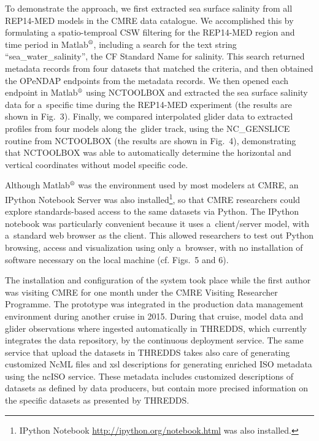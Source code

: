 \documentclass[osd, online, hvmath]{copernicus}
\begin{document}
To demonstrate the approach, we first extracted sea surface salinity from all REP14-MED models in the CMRE data catalogue. We accomplished this by 
formulating a spatio-temproal CSW filtering for the REP14-MED region and time period in Matlab$^{\text{\textregistered}}$, including a search for the text
string ``sea\_water\_salinity'', the CF Standard Name for salinity. This search returned metadata records from four datasets that matched the criteria, and then obtained the OPeNDAP endpoints from the metadata records. 
We then opened each endpoint in Matlab$^{\text{\textregistered}}$ using NCTOOLBOX and extracted the sea surface salinity data for a~specific time during the REP14-MED
experiment (the results are shown in Fig.~3). Finally, we compared interpolated glider data to extracted profiles from four models along the~glider track, using
the NC\_GENSLICE routine from NCTOOLBOX (the results are shown in Fig.~4), demonstrating that NCTOOLBOX was able to automatically
determine the horizontal and vertical coordinates without model specific code.

Although Matlab$^{\text{\textregistered}}$ was the environment used by
most modelers at CMRE, an IPython Notebook Server was also installed\footnote{IPython
  Notebook \url{http://ipython.org/notebook.html} was also
  installed.}, so that CMRE researchers could explore standards-based
access to the same datasets via Python. The IPython notebook was
particularly convenient because it uses a~client/server model, with
a~standard web browser as the client. This allowed researchers to test
out Python browsing, access and visualization using only a~browser,
with no installation of software necessary on the local machine
(cf. Figs.~5 and 6). %

The installation and configuration of the system took place while the first author was visiting CMRE for one month under the CMRE Visiting
Researcher Programme. The prototype was integrated in the production data management environment during another cruise in 2015. During that cruise, model data and glider observations where ingested automatically in THREDDS, which currently integrates the data repository, by the continuous deployment service. The same service that upload the datasets in THREDDS takes also care of generating customized NcML files and xsl descriptions for generating enriched ISO metadata using the ncISO service. These metadata includes customized descriptions of datasets as defined by data producers, but contain more precised information on the specific datasets as presented by THREDDS. 
\end{document}
